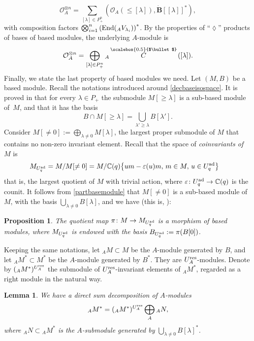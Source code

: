 \documentclass[10pt,a4paper]{amsart}
\numberwithin{equation}{section}
\newtheorem{lem}[teo]{Lemma}
\newtheorem{prop}[teo]{Proposition}
\theoremstyle{definition}
\newcommand{\mc}{\mathbb{C}}
\newcommand{\Oo}{{\mathcal O}}
\newcommand{\ra}{\rightarrow}
\newcommand{\smallbullet}{%
\vcenter{\hbox{\,\scalebox{0.5}{$\bullet$}\,}}
}
\begin{document}
\begin{equation}\label{decompositionOAcoad}
\Oo_A^{\otimes n} = \sum_{[\lambda] \in P_+^n} (\Oo_A(\leq [\lambda]), \dot{\mathbf{B}} [[\lambda]]^*),
\end{equation}
with composition factors $ \bigotimes_{i=1}^n \left({\rm End}({}_A V_{\lambda_i})\right)^*$. By the properties of ``$\lozenge$'' products of bases of based modules, the underlying $A$-module is
\begin{equation}\label{decompositionOA2}
\Oo_A^{\otimes n} = \bigoplus_{[\lambda] \in P_+^n} {}_A \overset{\raisebox{-1.5pt}{\scriptsize$\smallbullet$}}{C} ([\lambda]).
\end{equation}
Finally, we state the last property of based modules we need. Let $(M,B)$ be a based module. Recall the notations introduced around \eqref{decbaseisospace}. It is proved in \cite[Proposition 27.1.8]{Lusztig} that for every $\lambda\in P_+$ the submodule $M[\geq\lambda]$ is a sub-based module of~$M$, and that it has the basis
\begin{equation}\label{partbasemodule}
B\cap M[\geq\lambda] = \bigcup_{\lambda'\geq \lambda} B[\lambda'].
\end{equation}
Consider $M[\ne 0] := \bigoplus_{\lambda\ne 0} M[\lambda]$, the largest proper submodule of $M$ that contains no non-zero invariant element. Recall that the space of {\it coinvariants of} $M$ is
\begin{align*} M_{U_q^{\rm ad}} & = M/ M[\ne 0] = M/\mc(q)\big\{um-\varepsilon(u)m, \,m\in M, \,u\in U_q^{\rm ad}\big\}
\end{align*}
that is, the largest quotient of $M$ with trivial action, where $\varepsilon\colon U_q^{\rm ad}\ra \mc(q)$ is the counit. It follows from \eqref{partbasemodule} that $M[\ne 0]$ is a sub-based module of $M$, with the basis $\bigcup_{\lambda\ne 0} B[\lambda]$, and we have (this is, \cite[Proposition~27.2.6]{Lusztig}):
\begin{prop}\label{Linvbased} The quotient map $\pi\colon M \ra M_{U_q^{\rm ad}}$ is a morphism of based modules, where $M_{U_q^{\rm ad}}$ is endowed with the basis $B_{U_q^{\rm ad}} := \pi(B[0])$.
\end{prop}
Keeping the same notations, let ${}_AM \subset M$ be the $A$-module generated by $B$, and let ${{}_AM^* \subset M^*}$ be the $A$-module generated by $B^*$. They are $U_A^{\rm res}$-modules. Denote by $({}_A M^*)^{U_A^{\rm res}}$ the submodule of $U_A^{\rm res}$-invariant elements of ${}_A M^*$, regarded as a right module in the natural way.
\begin{lem} We have a direct sum decomposition of $A$-modules
\begin{equation}\label{decompAcoinv}
{}_A M^* = ({}_A M^*)^{U_A^{\rm res}} \bigoplus_A {}_A N,
\end{equation}
where ${}_A N\subset {}_A M^*$ is the $A$-submodule generated by $\bigcup_{\lambda\ne 0} B[\lambda]^*$.
\end{lem}
\end{document}
